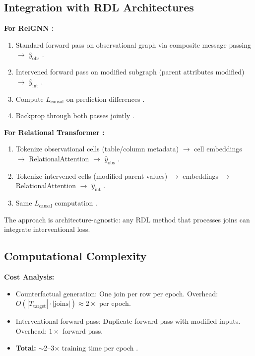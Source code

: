 \documentclass[11pt,letterpaper]{article}
\begin{document}
\subsection{Integration with RDL Architectures}

\textbf{For RelGNN \cite{Chen2025}:}

\begin{enumerate}
\item Standard forward pass on observational graph via composite message passing $\rightarrow$ $\hat{y}_{\text{obs}}$ \cite{Chen2025}.
\item Intervened forward pass on modified subgraph (parent attributes modified) $\rightarrow$ $\hat{y}_{\text{int}}$ \cite{Chen2025}.
\item Compute $L_{\text{causal}}$ on prediction differences \cite{Chen2025}.
\item Backprop through both passes jointly \cite{Chen2025}.
\end{enumerate}

\textbf{For Relational Transformer \cite{Ranjan2025}:}

\begin{enumerate}
\item Tokenize observational cells (table/column metadata) $\rightarrow$ cell embeddings $\rightarrow$ RelationalAttention $\rightarrow$ $\hat{y}_{\text{obs}}$ \cite{Ranjan2025}.
\item Tokenize intervened cells (modified parent values) $\rightarrow$ embeddings $\rightarrow$ RelationalAttention $\rightarrow$ $\hat{y}_{\text{int}}$ \cite{Ranjan2025}.
\item Same $L_{\text{causal}}$ computation \cite{Ranjan2025}.
\end{enumerate}

The approach is architecture-agnostic: any RDL method that processes joins can integrate interventional loss.

\subsection{Computational Complexity}

\textbf{Cost Analysis:}

\begin{itemize}
\item Counterfactual generation: One join per row per epoch. Overhead: $O(|T_{\text{target}}| \cdot |\text{joins}|) \approx 2\times$ per epoch.
\item Interventional forward pass: Duplicate forward pass with modified inputs. Overhead: $1\times$ forward pass.
\item \textbf{Total:} $\sim$2--3$\times$ training time per epoch \cite{Li2023}.
\end{itemize}
\end{document}
